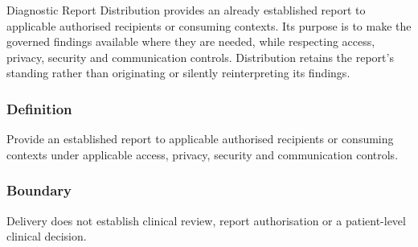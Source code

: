 Diagnostic Report Distribution provides an already established report to applicable authorised recipients or consuming contexts. Its purpose is to make the governed findings available where they are needed, while respecting access, privacy, security and communication controls. Distribution retains the report's standing rather than originating or silently reinterpreting its findings.

\subsubsection*{Definition}

Provide an established report to applicable authorised recipients or consuming contexts under applicable access, privacy, security and communication controls.

\subsubsection*{Boundary}

Delivery does not establish clinical review, report authorisation or a patient-level clinical decision.


